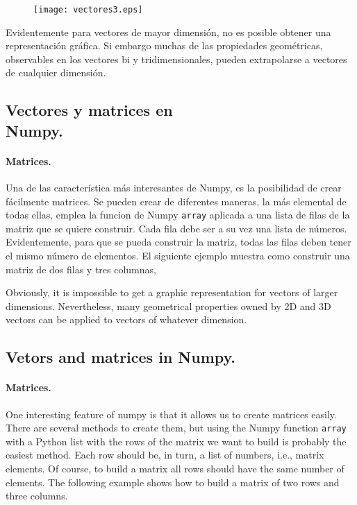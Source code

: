 \begin{figure}[h]
\centering
\texttt{[image: vectores3.eps]}
\label{fig:vectores3}
\end{figure}
\begin{paracol}{2}
Evidentemente para vectores de mayor dimensión, no es posible obtener una representación gráfica. Si embargo muchas de las propiedades geométricas, observables en los vectores bi y tridimensionales, pueden extrapolarse a vectores de cualquier dimensión.

\subsection{Vectores y matrices en\\ Numpy.}   
\paragraph{Matrices.} Una de las característica más interesantes de Numpy, es la posibilidad de crear fácilmente matrices. Se pueden crear de diferentes maneras, la más elemental de todas ellas, emplea la funcion de Numpy \texttt{array} aplicada a una lista de filas de la matriz que se quiere construir. Cada fila debe ser a su vez una lista de números. Evidentemente, para que se pueda construir la matriz, todas las filas deben tener el mismo número de elementos. El siguiente ejemplo muestra como construir una matriz de dos filas y tres columnas,

\switchcolumn 
Obviously, it is impossible to get a graphic representation for vectors of larger dimensions. Nevertheless, many geometrical properties owned by 2D and 3D vectors can be applied to vectors of whatever dimension.

\subsection{Vetors and matrices in Numpy.}
\paragraph{Matrices.} One interesting feature of numpy is that it allows us to create matrices easily. There are several methods to create them, but using the Numpy function \texttt{array} with a Python list with the rows of the matrix we want to build is probably the easiest method. Each row should be, in turn, a list of numbers, i.e., matrix elements. Of course, to build a matrix all rows should have the same number of elements. The following example shows how to build a matrix of two rows and three columns.
\end{paracol}

